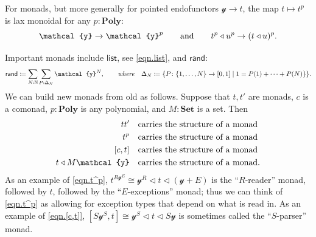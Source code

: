 \documentclass[11pt, one side, article]{memoir}
\theoremstyle{definition}
\theoremstyle{plain}
\newcommand{\Cat}[1]{\mathbf{#1}}%
\newcommand{\Fun}[1]{\mathsf{#1}}%
\newcommand{\tn}[1]{\textnormal{#1}}
\newcommand{\nn}{\mathbb{N}}
\newcommand{\smset}{\Cat{Set}}
\newcommand{\List}{\Fun{list}}
\newcommand{\rand}{\Fun{rand}}
\newcommand{\yon}{{\mathcal{y}}}
\newcommand{\poly}{\Cat{Poly}}
\newcommand{\0}{\textsf{0}}
\newcommand{\1}{\tn{\textsf{1}}}
\newcommand{\tri}{\mathbin{\triangleleft}}
\newcommand{\hh}[2][]{#1 \tn{#2} #1}
\newcommand{\qqand}{\hh[\qquad]{and}}
\newcommand{\hi}[4][]{#1 #2 \tn{\textit{#4}} #3}
\newcommand{\where}[1][,]{\hi[#1]{\qquad}{\quad}{where}}
\begin{document}
For monads, but more generally for pointed endofunctors $\yon\to t$, the map $t\mapsto t^p$ is lax monoidal for any $p:\poly$:
\begin{equation}
	\yon\to\yon^p
	\qqand
	t^p\tri u^p\to(t\tri u)^p.
\end{equation}

Important monads include $\List$, see \eqref{eqn.list}, and $\rand$:
\begin{equation}
	\rand\coloneqq\sum_{N:\nn}\sum_{P:\Delta_N}\yon^N
	\where
	\Delta_N\coloneqq\{P\colon\{1,\ldots,N\}\to[0,1]\mid1=P(1)+\cdots+P(N)\}\}.
\end{equation}
We can build new monads from old as follows. Suppose that $t,t'$ are monads, $c$ is a comonad, $p:\poly$ is any polynomial, and $M:\smset$ is a set. Then
\begin{align}
	tt'&\quad\tn{carries the structure of a monad}\\
	\label{eqn.t^p}
	t^p&\quad\tn{carries the structure of a monad}\\
	\label{eqn.[c,t]}
	[c,t]&\quad\tn{carries the structure of a monad}\\
	t\tri M\yon&\quad\tn{carries the structure of a monad}.
\end{align}
As an example of \eqref{eqn.t^p}, $t^{R\yon^E}\cong\yon^R\tri t\tri(\yon+E)$ is the ``$R$-reader'' monad, followed by $t$, followed by the ``$E$-exceptions'' monad; thus we can think of \eqref{eqn.t^p} as allowing for exception types that depend on what is read in. As an example of \eqref{eqn.[c,t]}, $[S\yon^S,t]\cong\yon^S\tri t\tri S\yon$ is sometimes called the ``$S$-parser'' monad.
\end{document}
